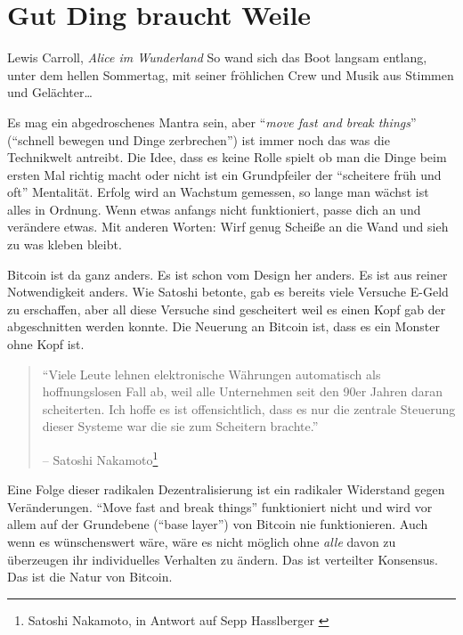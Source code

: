 \chapter{Gut Ding braucht Weile}
\label{les:18}

\begin{chapquote}{Lewis Carroll, \textit{Alice im Wunderland}}
So wand sich das Boot langsam entlang, unter dem hellen Sommertag, mit seiner
fröhlichen Crew und Musik aus Stimmen und Gelächter\ldots
\end{chapquote}

Es mag ein abgedroschenes Mantra sein, aber \enquote{\textit{move fast and break
things}} (\enquote{schnell bewegen und Dinge zerbrechen}) ist immer noch das was
die Technikwelt antreibt. Die Idee, dass es keine Rolle spielt ob man die Dinge
beim ersten Mal richtig macht oder nicht ist ein Grundpfeiler der
\enquote{scheitere früh und oft} Mentalität. Erfolg wird an Wachstum gemessen,
so lange man wächst ist alles in Ordnung. Wenn etwas anfangs nicht funktioniert,
passe dich an und verändere etwas. Mit anderen Worten: Wirf genug Scheiße an die
Wand und sieh zu was kleben bleibt.

Bitcoin ist da ganz anders. Es ist schon vom Design her anders. Es ist aus
reiner Notwendigkeit anders. Wie Satoshi betonte, gab es bereits viele Versuche
E-Geld zu erschaffen, aber all diese Versuche sind gescheitert weil es einen
Kopf gab der abgeschnitten werden konnte. Die Neuerung an Bitcoin ist, dass es
ein Monster ohne Kopf ist.

\begin{quotation}\begin{samepage}
\enquote{Viele Leute lehnen elektronische Währungen automatisch als
hoffnungslosen Fall ab, weil alle Unternehmen seit den 90er Jahren daran
scheiterten. Ich hoffe es ist offensichtlich, dass es nur die zentrale Steuerung
dieser Systeme war die sie zum Scheitern brachte.} \begin{flushright} -- Satoshi
Nakamoto\footnote{Satoshi Nakamoto, in  Antwort auf Sepp Hasslberger
\cite{satoshi-centralized-nature}}
\end{flushright}\end{samepage}\end{quotation}

Eine Folge dieser radikalen Dezentralisierung ist ein radikaler Widerstand gegen
Veränderungen. \enquote{Move fast and break things} funktioniert nicht und wird
vor allem auf der Grundebene (\enquote{base layer}) von Bitcoin nie
funktionieren. Auch wenn es wünschenswert wäre, wäre es nicht möglich ohne
\textit{alle} davon zu überzeugen ihr individuelles Verhalten zu ändern. Das ist
verteilter Konsensus. Das ist die Natur von Bitcoin.

